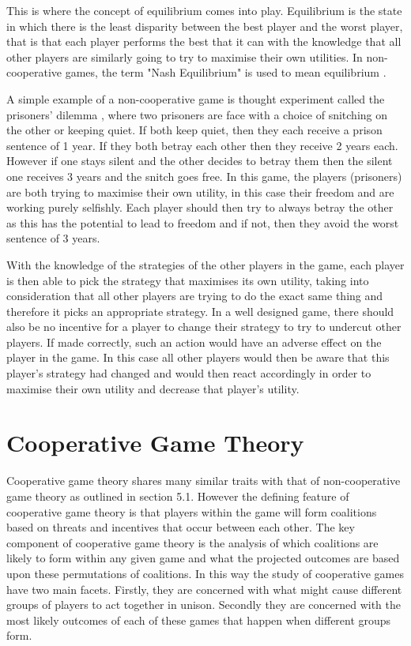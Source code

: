 \documentclass[a4paper, notitlepage]{report}
\begin{document}
This is where the concept of equilibrium comes into play. Equilibrium is the
state in which there is the least disparity between the best player and the
worst player, that is that each player performs the best that it can with the
knowledge that all other players are similarly going to try to maximise their
own utilities. In non-cooperative games, the term "Nash Equilibrium" is used to
mean equilibrium \cite{cournot1960researches}.

A simple example of a non-cooperative game is thought experiment called the
prisoners' dilemma \cite{poundstone1993prisoner}, where two prisoners are face
with a choice of snitching on the other or keeping quiet. If both keep quiet,
then they each receive a prison sentence of 1 year. If they both betray each other
then they receive 2 years each. However if one stays silent and the other
decides to betray them then the silent one receives 3 years and the snitch goes
free. In this game, the players (prisoners) are both trying to maximise their
own utility, in this case their freedom and are working purely selfishly. Each
player should then try to always betray the other as this has the potential to
lead to freedom and if not, then they avoid the worst sentence of 3 years. 

With the knowledge of the strategies of the other players in the game, each
player is then able to pick the strategy that maximises its own utility, taking
into consideration that all other players are trying to do the exact same thing
and therefore it picks an appropriate strategy. In a well designed game, there
should also be no incentive for a player to change their strategy to try to
undercut other players. If made correctly, such an action would have an adverse
effect on the player in the game. In this case all other players would then be
aware that this player’s strategy had changed and would then react accordingly
in order to maximise their own utility and decrease that player’s utility.
\section{Cooperative Game Theory}
\label{sec:orgd64bf75}
Cooperative game theory shares many similar traits with that of non-cooperative
game theory as outlined in section 5.1. However the defining feature of
cooperative game theory is that players within the game will form coalitions
based on threats and incentives that occur between each other. The key component
of cooperative game theory is the analysis of which coalitions are likely to
form within any given game and what the projected outcomes are based upon these
permutations of coalitions. In this way the study of cooperative games have two
main facets. Firstly, they are concerned with what might cause different groups
of players to act together in unison. Secondly they are concerned with the most
likely outcomes of each of these games that happen when different groups form.
\end{document}
